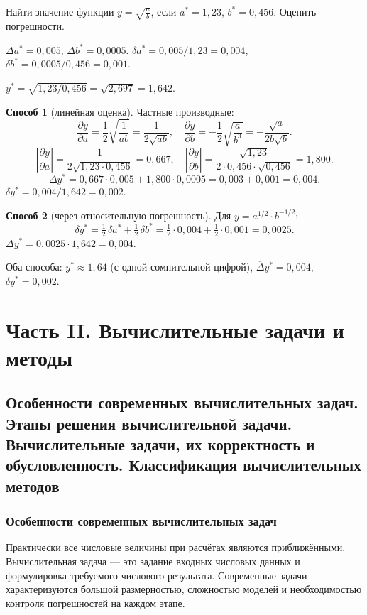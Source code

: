 Найти значение функции $y = \sqrt{\frac{a}{b}}$, если $a^* = 1{,}23$, $b^* = 0{,}456$. Оценить погрешности.

$\Delta a^* = 0{,}005$, $\Delta b^* = 0{,}0005$. $\delta a^* = 0{,}005/1{,}23 = 0{,}004$, $\delta b^* = 0{,}0005/0{,}456 = 0{,}001$.

$y^* = \sqrt{1{,}23/0{,}456} = \sqrt{2{,}697} = 1{,}642$.

\textbf{Способ 1} (линейная оценка). Частные производные:
\[
    \frac{\partial y}{\partial a} = \frac{1}{2}\sqrt{\frac{1}{ab}} = \frac{1}{2\sqrt{ab}}, \quad
    \frac{\partial y}{\partial b} = -\frac{1}{2}\sqrt{\frac{a}{b^3}} = -\frac{\sqrt{a}}{2b\sqrt{b}}.
\]
\[
    \left|\frac{\partial y}{\partial a}\right| = \frac{1}{2\sqrt{1{,}23 \cdot 0{,}456}} = 0{,}667, \quad
    \left|\frac{\partial y}{\partial b}\right| = \frac{\sqrt{1{,}23}}{2 \cdot 0{,}456 \cdot \sqrt{0{,}456}} = 1{,}800.
\]
\[
    \Delta y^* = 0{,}667 \cdot 0{,}005 + 1{,}800 \cdot 0{,}0005 = 0{,}003 + 0{,}001 = 0{,}004.
\]
$\delta y^* = 0{,}004 / 1{,}642 = 0{,}002$.

\textbf{Способ 2} (через относительную погрешность). Для $y = a^{1/2} \cdot b^{-1/2}$:
\[
    \delta y^* = \tfrac{1}{2}\,\delta a^* + \tfrac{1}{2}\,\delta b^* = \tfrac{1}{2} \cdot 0{,}004 + \tfrac{1}{2} \cdot 0{,}001 = 0{,}0025.
\]
$\Delta y^* = 0{,}0025 \cdot 1{,}642 = 0{,}004$.

Оба способа: $y^* \approx 1{,}64$ (с одной сомнительной цифрой), $\overline{\Delta} y^* = 0{,}004$, $\overline{\delta} y^* = 0{,}002$.


\newpage
\section{Часть II. Вычислительные задачи и методы}

\subsection{Особенности современных вычислительных задач. Этапы решения вычислительной задачи. Вычислительные задачи, их корректность и обусловленность. Классификация вычислительных методов}

\subsubsection*{Особенности современных вычислительных задач}

Практически все числовые величины при расчётах являются приближёнными. Вычислительная задача --- это задание входных числовых данных и формулировка требуемого числового результата. Современные задачи характеризуются большой размерностью, сложностью моделей и необходимостью контроля погрешностей на каждом этапе.

